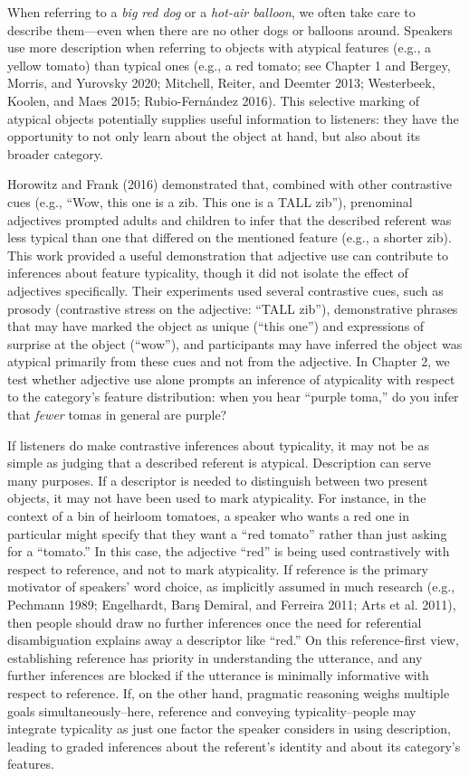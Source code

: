 \documentclass{ucetd}
\begin{document}
When referring to a \emph{big red dog} or a \emph{hot-air balloon}, we
often take care to describe them---even when there are no other dogs or
balloons around. Speakers use more description when referring to objects
with atypical features (e.g., a yellow tomato) than typical ones (e.g.,
a red tomato; see Chapter 1 and Bergey, Morris, and Yurovsky 2020;
Mitchell, Reiter, and Deemter 2013; Westerbeek, Koolen, and Maes 2015;
Rubio-Fernández 2016). This selective marking of atypical objects
potentially supplies useful information to listeners: they have the
opportunity to not only learn about the object at hand, but also about
its broader category.

Horowitz and Frank (2016) demonstrated that, combined with other
contrastive cues (e.g., ``Wow, this one is a zib. This one is a TALL
zib''), prenominal adjectives prompted adults and children to infer that
the described referent was less typical than one that differed on the
mentioned feature (e.g., a shorter zib). This work provided a useful
demonstration that adjective use can contribute to inferences about
feature typicality, though it did not isolate the effect of adjectives
specifically. Their experiments used several contrastive cues, such as
prosody (contrastive stress on the adjective: ``TALL zib''),
demonstrative phrases that may have marked the object as unique (``this
one'') and expressions of surprise at the object (``wow''), and
participants may have inferred the object was atypical primarily from
these cues and not from the adjective. In Chapter 2, we test whether
adjective use alone prompts an inference of atypicality with respect to
the category's feature distribution: when you hear ``purple toma,'' do
you infer that \emph{fewer} tomas in general are purple?

If listeners do make contrastive inferences about typicality, it may not
be as simple as judging that a described referent is atypical.
Description can serve many purposes. If a descriptor is needed to
distinguish between two present objects, it may not have been used to
mark atypicality. For instance, in the context of a bin of heirloom
tomatoes, a speaker who wants a red one in particular might specify that
they want a ``red tomato'' rather than just asking for a ``tomato.'' In
this case, the adjective ``red'' is being used contrastively with
respect to reference, and not to mark atypicality. If reference is the
primary motivator of speakers' word choice, as implicitly assumed in
much research (e.g., Pechmann 1989; Engelhardt, Barış Demiral, and
Ferreira 2011; Arts et al. 2011), then people should draw no further
inferences once the need for referential disambiguation explains away a
descriptor like ``red.'' On this reference-first view, establishing
reference has priority in understanding the utterance, and any further
inferences are blocked if the utterance is minimally informative with
respect to reference. If, on the other hand, pragmatic reasoning weighs
multiple goals simultaneously--here, reference and conveying
typicality--people may integrate typicality as just one factor the
speaker considers in using description, leading to graded inferences
about the referent's identity and about its category's features.
\end{document}

